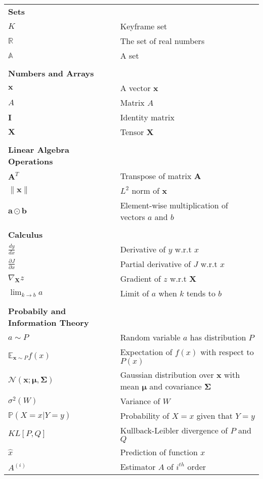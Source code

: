 \begin{longtable}{ll}
{\bf Sets} \\
$K$ & Keyframe set \\
$\mathbb{R}$ & The set of real numbers \\
$\mathbb{A}$ & A set \\
\\
{\bf Numbers and Arrays} \\
$\boldsymbol{x}$ & A vector $\boldsymbol{x}$ \\
$A$ & Matrix $A$ \\
$\boldsymbol{I}$ & Identity matrix \\
$\boldsymbol{X}$ & Tensor $\boldsymbol{X}$ \\
\\

{\bf Linear Algebra Operations} \\
$\boldsymbol{A}^{T}$ & Transpose of matrix $\boldsymbol{A}$ \\
$\lVert \boldsymbol{x} \rVert$ & $L^{2}$ norm of $\boldsymbol{x}$ \\
$\boldsymbol{a} \odot \boldsymbol{b}$ & Element-wise multiplication of vectors $a$ and $b$ \\

\\

{\bf Calculus} \\
$\frac{dy}{dx}$ & Derivative of $y$ w.r.t $x$ \\
$\frac{\partial{J}}{\partial{x}}$ & Partial derivative of $J$ w.r.t $x$ \\
$\nabla_{\boldsymbol{X}}z$ & Gradient of $z$ w.r.t $\boldsymbol{X}$ \\
$\lim_{k \rightarrow b} a$ & Limit of $a$ when $k$ tends to $b$ \\

\\

{\bf Probabily and Information Theory} \\
$a \sim P$ & Random variable $a$ has distribution $P$ \\
$\mathbb{E}_{\mathrm{\mathbf{x}}\sim P}f(x)$ & Expectation of $f(x)$ with respect to $P(x)$ \\
$\mathcal{N}(\boldsymbol{x}; \boldsymbol{\mu}, \boldsymbol{\Sigma})$ & Gaussian distribution over
$\boldsymbol{x}$ with mean $\boldsymbol{\mu}$ and covariance $\boldsymbol{\Sigma}$ \\
$\sigma^{2}(W)$ & Variance of $W$ \\
$\mathbb{P}(X = x| Y = y)$ & Probability of $X = x$ given that $Y = y$ \\
$KL[P,Q]$ & Kullback-Leibler divergence of $P$ and $Q$\\
$\hat{x}$ & Prediction of function $x$ \\
$A^{(i)}$ & Estimator $A$ of $i^{th}$ order \\



\end{longtable}
